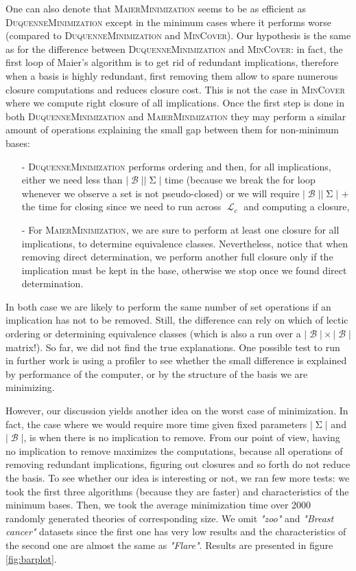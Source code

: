 \documentclass[runningheads]{llncs}
\DeclareMathOperator{\I}{\mathcal{L}}  %
\DeclareMathOperator{\Sg}{\Sigma}  %
\DeclareMathOperator{\B}{\mathcal{B}}
\begin{document}
One can also denote that \textsc{MaierMinimization} seems to be as efficient as \textsc{DuquenneMinimization} except in the minimum cases where it performs worse (compared to \textsc{DuquenneMinimization} and \textsc{MinCover}). Our hypothesis is the same as for the difference between \textsc{DuquenneMinimization} and \textsc{MinCover}: in fact, the first loop of Maier's algorithm is to get rid of redundant implications, therefore when a 
basis is highly redundant, first removing them allow to spare numerous closure
computations and reduces closure cost. This is not the case in \textsc{MinCover}
where we compute right closure of all implications. Once the first step is done
in both \textsc{DuquenneMinimization} and \textsc{MaierMinimization} they may perform a similar amount of operations explaining the small gap between them for
non-minimum bases:
\begin{itemize}
	\item[-] \textsc{DuquenneMinimization} performs ordering and then, for 
	all implications, either we need less than $|\B||\Sg|$ time (because we break the for loop whenever we observe a set is not pseudo-closed) or we
	will require $|\B||\Sg|$ + the time for closing since we need to run across $\I_c$ and computing a closure, 
	\item[-] For \textsc{MaierMinimization}, we are sure to perform at least
	one closure for all implications, to determine equivalence classes. Nevertheless, notice that when removing direct determination, we perform 
	another full closure only if the implication must be kept in the base,
	otherwise we stop once we found direct determination.
\end{itemize}
 In both case we are likely to perform the same number of set operations if an implication has not to be removed. Still, the difference
can rely on which of lectic ordering or determining equivalence classes (which is also a run over a $|\B|\times|\B|$ matrix!). So far, we did not find 
the true explanations. One possible test to run in further work is using a profiler to see whether the small difference is explained by performance of 
the computer, or by the structure of the basis we are minimizing.

However, our discussion yields another idea on the worst case of minimization. In fact, the case where we would require more time given fixed parameters $|\Sg|$ and $|\B|$, is when there is no implication to remove. From our point of view, having no implication to remove maximizes the computations, because all operations of removing redundant implications, figuring out closures and so forth do not reduce the basis. To see whether our idea is interesting or not, we ran few more tests: we took the first three algorithms (because they are faster) and characteristics of the minimum bases. Then, we took the average
minimization time over 2000 randomly generated theories of corresponding size.
We omit \textit{"zoo"} and \textit{"Breast cancer"} datasets since the first one has very low results and the characteristics of the second one are almost
the same as \textit{"Flare"}. Results are presented in figure \ref{fig:barplot}.
\end{document}
